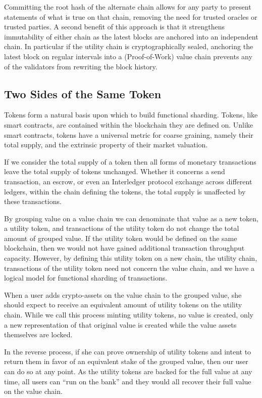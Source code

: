 \documentclass[12pt,a4paper, twocolumn]{article}
\begin{document}
Committing the root hash of the alternate chain allows for any party to present statements of what is true on that chain, removing the need for trusted oracles or trusted parties.  A second benefit of this approach is that it strengthens immutability of either chain as the latest blocks are anchored into an independent chain.  In particular if the utility chain is cryptographically sealed, anchoring the latest block on regular intervals into a (Proof-of-Work) value chain prevents any of the validators from rewriting the block history. \par

\subsection{Two Sides of the Same Token}
Tokens form a natural basis upon which to build functional sharding.  Tokens, like smart contracts, are contained within the blockchain they are defined on.  Unlike smart contracts, tokens have a universal metric for coarse graining, namely their total supply, and the extrinsic property of their market valuation.\par
If we consider the total supply of a token then all forms of monetary transactions leave the total supply of tokens unchanged.  Whether it concerns a send transaction, an escrow, or even an Interledger protocol exchange across different ledgers, within the chain defining the tokens, the total supply is unaffected by these transactions. \par
By grouping value on a value chain we can denominate that value as a new token, a utility token, and transactions of the utility token do not change the total amount of grouped value.  If the utility token would be defined on the same blockchain, then we would not have gained additional transaction throughput capacity.  However, by defining this utility token on a new chain, the utility chain, transactions of the utility token need not concern the value chain, and we have a logical model for functional sharding of transactions. \par
When a user adds crypto-assets on the value chain to the grouped value, she should expect to receive an equivalent amount of utility tokens on the utility chain.  While we call this process minting utility tokens, no value is created, only a new representation of that original value is created while the value assets themselves are locked. \par
In the reverse process, if she can prove ownership of utility tokens and intent to return them in favor of an equivalent stake of the grouped value, then our user can do so at any point.  As the utility tokens are backed for the full value at any time, all users can “run on the bank” and they would all recover their full value on the value chain. \par
\end{document}
